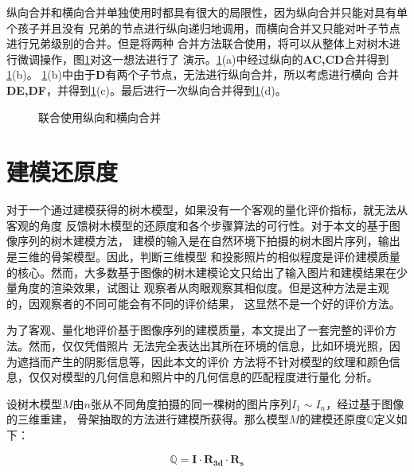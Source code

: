 纵向合并和横向合并单独使用时都具有很大的局限性，因为纵向合并只能对具有单个孩子并且没有
兄弟的节点进行纵向递归地调用，而横向合并又只能对叶子节点进行兄弟级别的合并。但是将两种
合并方法联合使用，将可以从整体上对树木进行微调操作，图\ref{fig:combine}对这一想法进行了
演示。\ref{fig:combine}(a)中经过纵向的\textbf{AC,CD}合并得到\ref{fig:combine}(b)。
\ref{fig:combine}(b)中由于\textbf{D}有两个子节点，无法进行纵向合并，所以考虑进行横向
合并\textbf{DE,DF}，并得到\ref{fig:combine}(c)。最后进行一次纵向合并得到\ref{fig:combine}(d)。

\begin{figure}[H]
	\centering
	\hspace{4em}
	\hspace{4em}
	\hspace{4em}
	\caption{联合使用纵向和横向合并}
	\label{fig:combine}
\end{figure}

\section{建模还原度}
\label{sec:qualityevaluation}
对于一个通过建模获得的树木模型，如果没有一个客观的量化评价指标，就无法从客观的角度
反馈树木模型的还原度和各个步骤算法的可行性。对于本文的基于图像序列的树木建模方法，
建模的输入是在自然环境下拍摄的树木图片序列，输出是三维的骨架模型。因此，判断三维模型
和投影照片的相似程度是评价建模质量的核心。然而，大多数基于图像的树木建模论文\cite{quanlong,
tanping,lichuan,tanping2,liu}只给出了输入图片和建模结果在少量角度的渲染效果，试图让
观察者从肉眼观察其相似度。但是这种方法是主观的，因观察者的不同可能会有不同的评价结果，
这显然不是一个好的评价方法。

为了客观、量化地评价基于图像序列的建模质量，本文提出了一套完整的评价方法。然而，仅仅凭借照片
无法完全表达出其所在环境的信息，比如环境光照，因为遮挡而产生的阴影信息等，因此本文的评价
方法将不针对模型的纹理和颜色信息，仅仅对模型的几何信息和照片中的几何信息的匹配程度进行量化
分析。

设树木模型$M$由$n$张从不同角度拍摄的同一棵树的图片序列$I_1\sim I_n$，经过基于图像的三维重建，
骨架抽取的方法进行建模所获得。那么模型$M$的建模还原度$\mathbb{Q}$定义如下：\\
\begin{definition}
	\[\mathbb{Q}=\mathbf{I}\cdot\mathbf{R_{3d}}\cdot\mathbf{R_s}\]
\end{definition}

